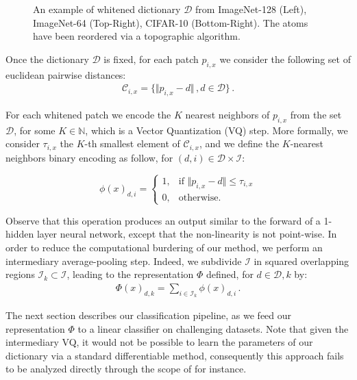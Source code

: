 \documentclass{article}
\begin{document}
{\begin{figure}[h]
{\label{fig:subfig3}}
\caption{An example of whitened dictionary  $\mathcal{D}$ from ImageNet-128 (Left), ImageNet-64 (Top-Right), CIFAR-10 (Bottom-Right). The atoms have been reordered via a topographic algorithm.}
\label{dico}
\end{figure}


Once the dictionary $\mathcal{D}$ is fixed, for each patch $p_{i,x}$ we consider the following set of euclidean pairwise distances:
\begin{align*}\mathcal{C}_{i, x} =\{\Vert p_{i, x} - d \Vert\,, d\in\mathcal{D} \}\,.\end{align*}
 
For each whitened patch we encode the $K$ nearest neighbors of $p_{i,x}$ from the set $\mathcal{D}$, for some $ K \in \mathbb{N}$, which is a Vector Quantization (VQ) step.
More formally, we consider $\tau_{i,x}$ the $K$-th smallest  element of $\mathcal{C}_{i,x}$, and we define the $K$-nearest neighbors binary encoding as follow, for $(d,i)\in\mathcal{D}\times\mathcal{I}$:


\begin{equation}
\phi(x)_{d,i}=
\begin{cases}
1,&\text{if } \Vert  p_{i,x} - d\Vert \leq \tau_{i,x}\\
0,&\text{otherwise}.
\end{cases}
\end{equation}






Observe that this operation produces an output similar to the forward of a 1-hidden layer neural network, except that the non-linearity is not point-wise. In order to reduce the computational burdering of our method, we perform an intermediary average-pooling step.
Indeed, we subdivide $\mathcal{I}$ in squared overlapping regions $\mathcal{I}_k\subset\mathcal{I}$, leading to the representation $\Phi$ defined, for $d\in\mathcal{D}, k$ by:
\begin{align*}\Phi(x)_{d,k}= \sum_{i\in \mathcal{I}_k}\phi(x)_{d,i}\,.\end{align*}

The next section describes our classification pipeline, as we feed our representation $\Phi$ to a linear classifier on challenging datasets. Note that given the intermediary VQ, it would not be possible to learn the parameters of our dictionary via a standard differentiable method, consequently this approach fails to be analyzed directly through the scope of \cite{chizat2018global} for instance.




}
\end{document}
